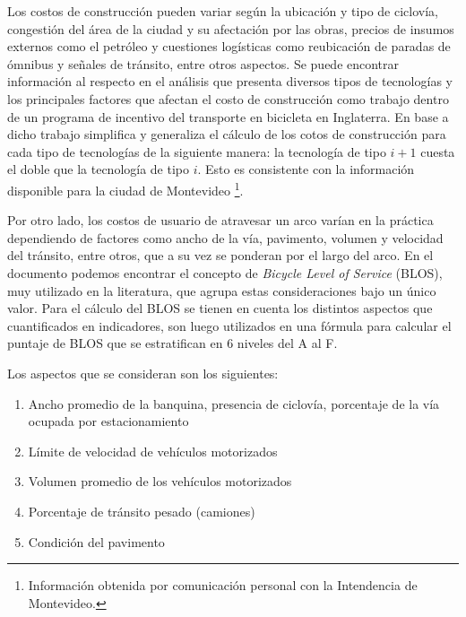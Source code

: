 \documentclass{article}
\begin{document}
  Los costos de construcción pueden variar según la ubicación y tipo de ciclovía, congestión del área de la ciudad y su afectación por las obras, precios de insumos externos como el petróleo y cuestiones logísticas como reubicación de paradas de ómnibus y señales de tránsito, entre otros aspectos. Se puede encontrar información al respecto en el análisis \cite{typicalcostsofcylcing} que presenta diversos tipos de tecnologías y los principales factores que afectan el costo de construcción como trabajo dentro de un programa de incentivo del transporte en bicicleta en Inglaterra. En base a dicho trabajo \cite{baya2021} simplifica y generaliza el cálculo de los cotos de construcción para cada tipo de tecnologías de la siguiente manera: la tecnología de tipo $i+1$ cuesta el doble que la tecnología de tipo $i$. Esto es consistente con la información disponible para la ciudad de Montevideo \footnote{Información obtenida por comunicación personal con la Intendencia de Montevideo.}.

  Por otro lado, los costos de usuario de atravesar un arco varían en la práctica dependiendo de factores como ancho de la vía, pavimento, volumen y velocidad del tránsito, entre otros, que a su vez se ponderan por el largo del arco. En el documento \cite{blos2007} podemos encontrar el concepto de {\it Bicycle Level of Service} (BLOS), muy utilizado en la literatura, que agrupa estas consideraciones bajo un único valor. Para el cálculo del BLOS se tienen en cuenta los distintos aspectos que cuantificados en indicadores, son luego utilizados en una fórmula para calcular el puntaje de BLOS que se estratifican en 6 niveles del A al F.

  Los aspectos que se consideran son los siguientes:

  \begin{enumerate}
    \item{Ancho promedio de la banquina, presencia de ciclovía, porcentaje de la vía ocupada por estacionamiento}
    \item{Límite de velocidad de vehículos motorizados}
    \item{Volumen promedio de los vehículos motorizados}
    \item{Porcentaje de tránsito pesado (camiones)}
    \item{Condición del pavimento}
  \end{enumerate}
\end{document}
